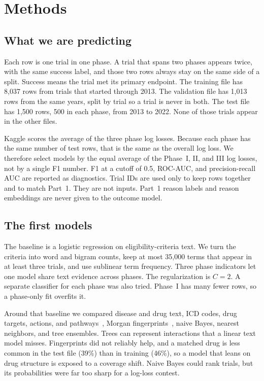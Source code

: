 \section{Methods}
\label{sec:methods}

\subsection{What we are predicting}

Each row is one trial in one phase. A trial that spans two phases appears
twice, with the same success label, and those two rows always stay on the
same side of a split. Success means the trial met its primary endpoint.
The training file has 8,037 rows from trials that started through 2013. The
validation file has 1,013 rows from the same years, split by trial so a trial
is never in both. The test file has 1,500 rows, 500 in each phase, from 2013
to 2022. None of those trials appear in the other files.

Kaggle scores the average of the three phase log losses. Because each phase
has the same number of test rows, that is the same as the overall log loss.
We therefore select models by the equal average of the Phase~I, II, and III
log losses, not by a single F1 number. F1 at a cutoff of 0.5, ROC-AUC, and
precision-recall AUC are reported as diagnostics. Trial IDs are used only to
keep rows together and to match Part~1. They are not inputs. Part~1 reason
labels and reason embeddings are never given to the outcome model.

\subsection{The first models}

The baseline is a logistic regression on eligibility-criteria text. We turn
the criteria into word and bigram counts, keep at most 35,000 terms that
appear in at least three trials, and use sublinear term frequency. Three
phase indicators let one model share text evidence across phases. The
regularization is $C = 2$. A separate classifier for each phase was also
tried. Phase~I has many fewer rows, so a phase-only fit overfits it.

Around that baseline we compared disease and drug text, ICD codes, drug
targets, actions, and pathways~\cite{milacic2024reactome}, Morgan
fingerprints~\cite{rogers2010extended,rdkit}, naive Bayes, nearest neighbors,
and tree ensembles. Trees can represent interactions that a linear text model
misses. Fingerprints did not reliably help, and a matched drug is less common
in the test file (39\%) than in training (46\%), so a model that leans on drug
structure is exposed to a coverage shift. Naive Bayes could rank trials, but
its probabilities were far too sharp for a log-loss contest.

